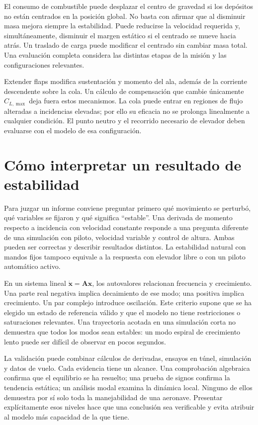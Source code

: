 El consumo de combustible puede desplazar el centro de gravedad si los depósitos no están centrados en la posición global. No basta con afirmar que al disminuir masa mejora siempre la estabilidad. Puede reducirse la velocidad requerida y, simultáneamente, disminuir el margen estático si el centrado se mueve hacia atrás. Un traslado de carga puede modificar el centrado sin cambiar masa total. Una evaluación completa considera las distintas etapas de la misión y las configuraciones relevantes.

Extender flaps modifica sustentación y momento del ala, además de la corriente descendente sobre la cola. Un cálculo de compensación que cambie únicamente $C_{L,\max}$ deja fuera estos mecanismos. La cola puede entrar en regiones de flujo alteradas a incidencias elevadas; por ello su eficacia no se prolonga linealmente a cualquier condición. El punto neutro y el recorrido necesario de elevador deben evaluarse con el modelo de esa configuración.

\section{Cómo interpretar un resultado de estabilidad}
Para juzgar un informe conviene preguntar primero qué movimiento se perturbó, qué variables se fijaron y qué significa ``estable''. Una derivada de momento respecto a incidencia con velocidad constante responde a una pregunta diferente de una simulación con piloto, velocidad variable y control de altura. Ambas pueden ser correctas y describir resultados distintos. La estabilidad natural con mandos fijos tampoco equivale a la respuesta con elevador libre o con un piloto automático activo.

En un sistema lineal $\dot{\boldsymbol x}=\boldsymbol A\boldsymbol x$, los autovalores relacionan frecuencia y crecimiento. Una parte real negativa implica decaimiento de ese modo; una positiva implica crecimiento. Un par complejo introduce oscilación. Este criterio supone que se ha elegido un estado de referencia válido y que el modelo no tiene restricciones o saturaciones relevantes. Una trayectoria acotada en una simulación corta no demuestra que todos los modos sean estables: un modo espiral de crecimiento lento puede ser difícil de observar en pocos segundos.

La validación puede combinar cálculos de derivadas, ensayos en túnel, simulación y datos de vuelo. Cada evidencia tiene un alcance. Una comprobación algebraica confirma que el equilibrio se ha resuelto; una prueba de signos confirma la tendencia estática; un análisis modal examina la dinámica local. Ninguno de ellos demuestra por sí solo toda la manejabilidad de una aeronave. Presentar explícitamente esos niveles hace que una conclusión sea verificable y evita atribuir al modelo más capacidad de la que tiene.

